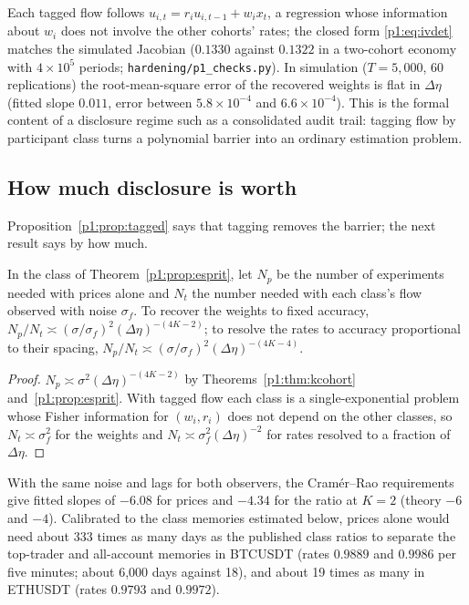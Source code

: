 Each tagged flow follows $u_{i,t}=r_iu_{i,t-1}+w_ix_t$, a regression whose information about $w_i$ does not involve the other cohorts' rates; the closed form \eqref{p1:eq:ivdet} matches the simulated Jacobian ($0.1330$ against $0.1322$ in a two-cohort economy with $4\times10^5$ periods; \texttt{hardening/p1\_checks.py}). In simulation ($T=5{,}000$, 60 replications) the root-mean-square error of the recovered weights is flat in $\Delta\eta$ (fitted slope $0.011$, error between $5.8\times10^{-4}$ and $6.6\times10^{-4}$). This is the formal content of a disclosure regime such as a consolidated audit trail: tagging flow by participant class turns a polynomial barrier into an ordinary estimation problem.

\subsection{How much disclosure is worth}\label{p1:sec:discvalue}

Proposition~\ref{p1:prop:tagged} says that tagging removes the barrier; the next result says by how much.

\begin{theorem}\label{p1:thm:discvalue}
In the class of Theorem~\ref{p1:prop:esprit}, let $N_p$ be the number of experiments needed with prices alone and $N_t$ the number needed with each class's flow observed with noise $\sigma_f$. To recover the weights to fixed accuracy, $N_p/N_t\asymp(\sigma/\sigma_f)^2(\Delta\eta)^{-(4K-2)}$; to resolve the rates to accuracy proportional to their spacing, $N_p/N_t\asymp(\sigma/\sigma_f)^2(\Delta\eta)^{-(4K-4)}$.
\end{theorem}

\begin{proof}
$N_p\asymp\sigma^2(\Delta\eta)^{-(4K-2)}$ by Theorems~\ref{p1:thm:kcohort} and~\ref{p1:prop:esprit}. With tagged flow each class is a single-exponential problem whose Fisher information for $(w_i,r_i)$ does not depend on the other classes, so $N_t\asymp\sigma_f^2$ for the weights and $N_t\asymp\sigma_f^2(\Delta\eta)^{-2}$ for rates resolved to a fraction of $\Delta\eta$.
\end{proof}

With the same noise and lags for both observers, the Cram\'er--Rao requirements give fitted slopes of $-6.08$ for prices and $-4.34$ for the ratio at $K=2$ (theory $-6$ and $-4$). Calibrated to the class memories estimated below, prices alone would need about 333 times as many days as the published class ratios to separate the top-trader and all-account memories in BTCUSDT (rates $0.9889$ and $0.9986$ per five minutes; about 6{,}000 days against 18), and about 19 times as many in ETHUSDT (rates $0.9793$ and $0.9972$).

